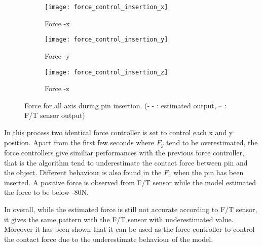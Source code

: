 \begin{figure}[h]
  \begin{subfigure}[t]{0.5\textwidth}
    \centering
    \texttt{[image: force\_control\_insertion\_x]} 
    \caption{Force -x}
  \end{subfigure}
  \begin{subfigure}[t]{0.5\textwidth}
    \centering
    \texttt{[image: force\_control\_insertion\_y]}
    \caption{Force -y}
  \end{subfigure}
  \begin{subfigure}[t]{0.5\textwidth}
    \centering
    \texttt{[image: force\_control\_insertion\_z]}
    \caption{Force -z}
  \end{subfigure}  
  \caption{Force for all axis during pin insertion. (- - : estimated output, -- : F/T sensor output)}
  \label{fig:force control pin}
\end{figure}

In this process two identical force controller is set to control each x and y position. Apart from the first few seconds where $F_y$ tend to be overestimated, the force controllers give similiar performances with the previous force controller, that is the algorithm tend to underestimate the contact force between pin and the object. Different behaviour is also found in the $F_z$ when the pin has been inserted. A positive force is observed from F/T sensor while the model estimated the force to be below -80N. 


In overall, while the estimated force is still not accurate according to F/T sensor, it gives the same pattern with the F/T sensor with underestimated value. Moreover it has been shown that it can be used as the force controller to control the contact force due to the underestimate behaviour of the model. 

